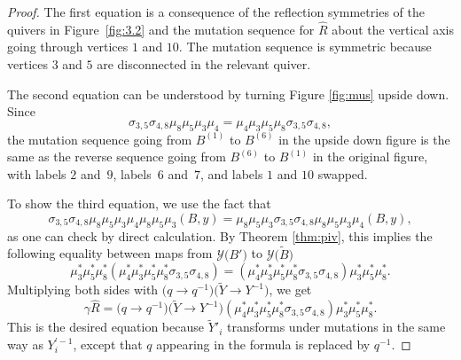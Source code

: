 \documentclass[pdftex]{sigma}
\numberwithin{equation}{section}
\begin{document}
\begin{proof}
 The first equation is a consequence of the reflection symmetries of
 the quivers in Figure~\ref{fig:3.2} and the mutation sequence
 for $\widehat{R}$ about the vertical axis going through vertices $1$
 and $10$. The mutation sequence is symmetric because vertices $3$
 and $5$ are disconnected in the relevant quiver.

 The second equation can be understood by turning Figure
 \ref{fig:mus} upside down. Since
\[
\sigma_{3,5} \sigma_{4,8} \mu_8 \mu_5 \mu_3 \mu_4 = \mu_4 \mu_3
 \mu_5 \mu_8 \sigma_{3,5} \sigma_{4,8}, \]
 the mutation sequence going
 from $B^{(1)}$ to $B^{(6)}$ in the upside down figure is the same as
 the reverse sequence going from $B^{(6)}$ to $B^{(1)}$ in the
 original figure, with labels $2$ and~$9$, labels~$6$ and~$7$, and labels $1$
 and $10$ swapped.

 To show the third equation, we use the fact that
 \[
 \sigma_{3,5} \sigma_{4,8} \mu_8 \mu_5 \mu_3 \mu_4
 \mu_8 \mu_5 \mu_3(B,y)
 =
 \mu_8 \mu_5 \mu_3
 \sigma_{3,5} \sigma_{4,8} \mu_8 \mu_5 \mu_3 \mu_4(B,y),
 \]
 as one can check by direct calculation. By Theorem \ref{thm:piv},
 this implies the following equality between maps from
 $\mathcal{Y}\bigl(B'\bigr)$ to $\mathcal{Y}\bigl(\widetilde{B}\bigr)$
 \[
 \mu_3^* \mu_5^* \mu_8^*
 (\mu_4^* \mu_3^* \mu_5^* \mu_8^* \sigma_{3,5} \sigma_{4,8})
 =
 (\mu_4^* \mu_3^* \mu_5^* \mu_8^* \sigma_{3,5} \sigma_{4,8})
 \mu_3^* \mu_5^* \mu_8^*.
 \]
 Multiplying both sides with
 $\bigl(q \to q^{-1}\bigr) \bigl(\widetilde{Y} \to Y^{-1}\bigr)$, we get
 \[
 \gamma\widehat{R}
 =
 \bigl(q \to q^{-1}\bigr) \bigl(\widetilde{Y} \to Y^{-1}\bigr)
 (\mu_4^* \mu_3^* \mu_5^* \mu_8^* \sigma_{3,5} \sigma_{4,8})
 \mu_3^* \mu_5^* \mu_8^*.
 \]
 This is the desired equation because $\widetilde{Y}'_i$ transforms
 under mutations in the same way as $Y_i^{\prime-1}$, except that $q$
 appearing in the formula is replaced by $q^{-1}$.
\end{proof}
\end{document}
